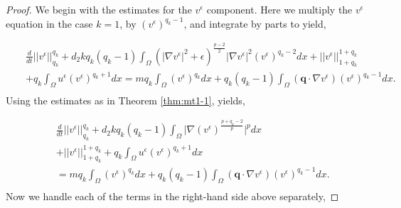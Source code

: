 \documentclass[10pt]{amsart}
\theoremstyle{plain}
\theoremstyle{definition}
\begin{document}
\begin{proof}

    



We begin with the estimates for the $v^{\epsilon}$ component.
Here we multiply the $v^{\epsilon}$ equation in the case $k=1$, by $(v^{\epsilon})^{q_{k} - 1}$, and integrate by parts to yield,


\begin{eqnarray}
&& \frac{d}{dt}||v^{\epsilon}||^{q_{k}}_{q_{k}}  
 + d_{2} k q_{k}(q_{k}-1)\int_{\Omega} \left(
|\nabla v^{\epsilon}|^{2}+{\epsilon}\right)^{\frac{p-2}{2}}|\nabla v^{\epsilon}|^{2} (v^{\epsilon})^{q_{k}-2} dx
+||v^{\epsilon}||^{1+q_{k}}_{1+q_{k}} \nonumber \\
&& + q_{k}\int_{\Omega}  u^{\epsilon}(v^{\epsilon})^{q_{k}+1}dx =m q_{k}\int_{\Omega} (v^{\epsilon})^{q_{k}}dx + q_{k}(q_{k}-1)\int_{\Omega} (\textbf{q}\cdot \nabla v^{\epsilon}) (v^{\epsilon})^{q_{k}-1}dx.\nonumber \\
\end{eqnarray}
%
Using the estimates as in Theorem \ref{thm:mt1-1}, yields,




\begin{eqnarray}
&& \frac{d}{dt}||v^{\epsilon}||^{q_{k}}_{q_{k}}  
 + d_{2} k q_{k}(q_{k}-1)\int_{\Omega} 
\lvert \nabla \left(v^{\epsilon}\right)^{\frac{p + q_{k} - 2}{p}} \rvert ^{p}dx \nonumber \\
&&+||v^{\epsilon}||^{1+q_{k}}_{1+q_{k}}
 + q_{k}\int_{\Omega}  u^{\epsilon}(v^{\epsilon})^{q_{k}+1}dx  \nonumber \\
 && = m q_{k}\int_{\Omega} (v^{\epsilon})^{q_{k}}dx + q_{k}(q_{k}-1)\int_{\Omega} (\textbf{q}\cdot \nabla v^{\epsilon}) (v^{\epsilon})^{q_{k}-1}dx.\nonumber \\
\end{eqnarray}
%
Now we handle each of the terms in the right-hand side above separately,


\end{proof}
\end{document}
